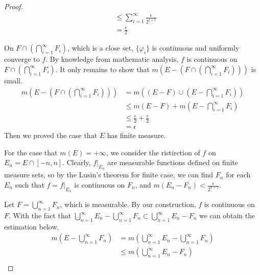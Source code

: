 \documentclass[lang=en, 12pt]{elegantbook}
\begin{document}
\begin{proof}
\begin{equation*}
\begin{aligned}
                    &\leq \sum_{i=1}^{\infty} \frac{\epsilon}{2^{i +1}}\\
                    &= \frac{\epsilon}{2}
                \end{aligned}
            \end{equation*}\par 
                On $F \cap (\bigcap_{i=1}^{\infty} F_i)$, which is a close set, $\{\varphi_i\}$ is continuous and uniformly converge to
            $f$. By knowledge from mathematic analysis, $f$ is continuous on $F \cap (\bigcap_{i=1}^{\infty} F_i)$. It only remains to show that 
            $m (E - (F \cap (\bigcap_{i=1}^{\infty} F_i)))$ is small. 
            \begin{equation*}
                \begin{aligned}
                    m (E - (F \cap (\bigcap_{i=1}^{\infty} F_i))) &= m ((E - F) \cup (E-\bigcap_{i=1}^{\infty} F_i))\\
                    &\leq m (E - F) + m(E-\bigcap_{i=1}^{\infty} F_i)\\
                    &\leq \frac{\epsilon}{2} +\frac{\epsilon}{2}\\
                    &=  \epsilon
                \end{aligned}
            \end{equation*}
            Then we proved the case that $E$ has finite measure.\par
                For the case that $m(E) = +\infty$, we consider the ristirction of $f$ on $E_n = E \cap [-n,n]$. Clearly, $f|_{E_n}$ are  
            measurable functions defined on finite measure sets, so by the Lusin's theorem for finite case, we can find $F_n$ for each 
            $E_n$ such that $f = f|_{E_n}$ is continuous on $F_n$, and $m(E_n-F_n) < \frac{\epsilon}{2^{n+1}}$.\par
                Let $F = \bigcup_{n=1}^{\infty} F_n$, which is measurable. By our construction, $f$ is continuous on $F$. With the fact that 
            $\bigcup_{n=1}^{\infty}E_n - \bigcup_{n=1}^{\infty}F_n \subset \bigcup_{n=1}^{\infty}E_n -F_n$ we can obtain the estimation below,
            \begin{equation*}
                \begin{aligned}
                    m(E-\bigcup_{n=1}^{\infty} F_n) &= m(\bigcup_{n=1}^{\infty}E_n - \bigcup_{n=1}^{\infty}F_n)\\
                    &\leq m( \bigcup_{n=1}^{\infty}E_n - F_n)\\

\end{aligned}
\end{equation*}
\end{proof}
\end{document}
